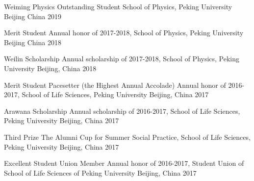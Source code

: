 




\begin{cvhonors}
	

\cvhonor
{Weiming Physics Outstanding Student} %
{School of Physics, Peking University} %
{Beijing China} %
{2019} %


\cvhonor
{Merit Student} %
{Annual honor of 2017-2018, School of Physics, Peking University} %
{Beijing China} %
{2018} %


\cvhonor
{Weilin Scholarship} %
{Annual scholarship of 2017-2018, School of Physics, Peking University} %
{Beijing, China} %
{2018} %


\cvhonor
{Merit Student Pacesetter (the Highest Annual Accolade)} %
{Annual honor of 2016-2017, School of Life Sciences, Peking University} %
{Beijing, China} %
{2017} %


\cvhonor
{Arawana Scholarship} %
{Annual scholarship of 2016-2017, School of Life Sciences, Peking University} %
{Beijing, China} %
{2017} %


\cvhonor
{Third Prize} %
{The Alumni Cup for Summer Social Practice, School of Life Sciences, Peking University} %
{Beijing, China} %
{2017} %

\cvhonor
{Excellent Student Union Member} %
{Annual honor of 2016-2017, Student Union of School of Life Sciences of Peking University} %
{Beijing, China} %
{2017} %


\end{cvhonors}
